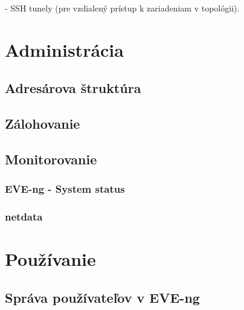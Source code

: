 - SSH tunely (pre vzdialený prístup k zariadeniam v topológii).

\section{Administrácia}

\subsection{Adresárova štruktúra}

\subsection{Zálohovanie}

\subsection{Monitorovanie}

\subsubsection{EVE-ng - System status}

\subsubsection{netdata}

\section{Používanie}

\subsection{Správa používateľov v EVE-ng}
